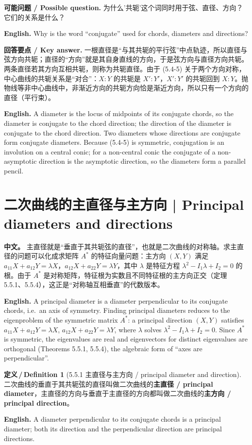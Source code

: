 \documentclass[UTF8,11pt,a4paper]{ctexart}
\newcommand{\APS}[2]{\par\noindent\textbf{中文。} #1\par\noindent\textbf{English.} #2\par\smallskip}
\newcommand{\EN}[1]{\par\noindent \textbf{English.} #1\par}
\newcommand{\ASK}[4]{\par\noindent \textbf{可能问题 / Possible question.} #1\par\EN{#2}\noindent \textbf{回答要点 / Key answer.} #3\par\EN{#4}\medskip}
\theoremstyle{definition}
\newtheorem*{definition}{定义\,/\,Definition}
\begin{document}
\ASK{为什么'共轭'这个词同时用于弦、直径、方向？它们的关系是什么？}{Why is the word ``conjugate'' used for chords, diameters and directions?}{一根直径是``与其共轭的平行弦''中点轨迹，所以直径与弦方向共轭；直径的``方向''就是其自身直线的方向，于是弦方向与直径方向共轭。两条直径若其方向互相共轭，则称为共轭直径。由于 (5.4-5) 关于两个方向对称，中心曲线的共轭关系是``对合''：$X:Y$ 的共轭是 $X':Y'$，$X':Y'$ 的共轭回到 $X:Y$。抛物线等非中心曲线中，非渐近方向的共轭方向恰是渐近方向，所以只有一个方向的直径（平行束）。}{A diameter is the locus of midpoints of its conjugate chords, so the diameter is conjugate to the chord direction; the direction of the diameter is conjugate to the chord direction. Two diameters whose directions are conjugate form conjugate diameters. Because (5.4-5) is symmetric, conjugation is an involution on a central conic; for a non-central conic the conjugate of a non-asymptotic direction is the asymptotic direction, so the diameters form a parallel pencil.}

\section{\label{sec:13}二次曲线的主直径与主方向 | Principal diameters and directions}
\APS{主直径就是``垂直于其共轭弦的直径''，也就是二次曲线的对称轴。求主直径的问题可以化成求矩阵 $A^*$ 的特征向量问题：主方向 $(X,Y)$ 满足 $a_{11}X+a_{12}Y=\lambda X$，$a_{12}X+a_{22}Y=\lambda Y$，其中 $\lambda$ 是特征方程 $\lambda^2-I_1\lambda+I_2=0$ 的根。由于 $A^*$ 是对称矩阵，特征根为实数且不同特征根的主方向正交（定理 5.5.1、5.5.4），这正是``对称轴互相垂直''的代数版本。}{A principal diameter is a diameter perpendicular to its conjugate chords, i.e.\ an axis of symmetry. Finding principal diameters reduces to the eigenproblem of the symmetric matrix $A^*$: a principal direction $(X,Y)$ satisfies $a_{11}X+a_{12}Y=\lambda X$, $a_{12}X+a_{22}Y=\lambda Y$, where $\lambda$ solves $\lambda^2-I_1\lambda+I_2=0$. Since $A^*$ is symmetric, the eigenvalues are real and eigenvectors for distinct eigenvalues are orthogonal (Theorems 5.5.1, 5.5.4), the algebraic form of ``axes are perpendicular''.}

\begin{definition}[5.5.1 主直径与主方向 / principal diameter and direction]\label{def:principal}
二次曲线的垂直于其共轭弦的直径叫做二次曲线的\textbf{主直径 / principal diameter}，主直径的方向与垂直于主直径的方向都叫做二次曲线的\textbf{主方向 / principal direction}。
\EN{A diameter perpendicular to its conjugate chords is a principal diameter; both its direction and the perpendicular direction are principal directions.}
\end{definition}
\end{document}
